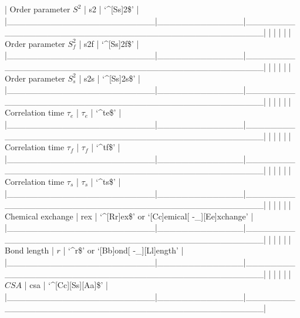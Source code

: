 | Order parameter $S^2$     | s2           | `\^{}[Ss]2\$'                                        |
|\_\_\_\_\_\_\_\_\_\_\_\_\_\_\_\_\_\_\_\_\_\_\_\_|\_\_\_\_\_\_\_\_\_\_\_\_\_\_|\_\_\_\_\_\_\_\_\_\_\_\_\_\_\_\_\_\_\_\_\_\_\_\_\_\_\_\_\_\_\_\_\_\_\_\_\_\_\_\_\_\_\_\_\_\_\_\_\_\_|
|                        |              |                                                  |
| Order parameter $S^2_f$    | s2f          | `\^{}[Ss]2f\$'                                       |
|\_\_\_\_\_\_\_\_\_\_\_\_\_\_\_\_\_\_\_\_\_\_\_\_|\_\_\_\_\_\_\_\_\_\_\_\_\_\_|\_\_\_\_\_\_\_\_\_\_\_\_\_\_\_\_\_\_\_\_\_\_\_\_\_\_\_\_\_\_\_\_\_\_\_\_\_\_\_\_\_\_\_\_\_\_\_\_\_\_|
|                        |              |                                                  |
| Order parameter $S^2_s$    | s2s          | `\^{}[Ss]2s\$'                                       |
|\_\_\_\_\_\_\_\_\_\_\_\_\_\_\_\_\_\_\_\_\_\_\_\_|\_\_\_\_\_\_\_\_\_\_\_\_\_\_|\_\_\_\_\_\_\_\_\_\_\_\_\_\_\_\_\_\_\_\_\_\_\_\_\_\_\_\_\_\_\_\_\_\_\_\_\_\_\_\_\_\_\_\_\_\_\_\_\_\_|
|                        |              |                                                  |
| Correlation time $\tau_e$    | $\tau_e$           | `\^{}te\$'                                           |
|\_\_\_\_\_\_\_\_\_\_\_\_\_\_\_\_\_\_\_\_\_\_\_\_|\_\_\_\_\_\_\_\_\_\_\_\_\_\_|\_\_\_\_\_\_\_\_\_\_\_\_\_\_\_\_\_\_\_\_\_\_\_\_\_\_\_\_\_\_\_\_\_\_\_\_\_\_\_\_\_\_\_\_\_\_\_\_\_\_|
|                        |              |                                                  |
| Correlation time $\tau_f$    | $\tau_f$           | `\^{}tf\$'                                           |
|\_\_\_\_\_\_\_\_\_\_\_\_\_\_\_\_\_\_\_\_\_\_\_\_|\_\_\_\_\_\_\_\_\_\_\_\_\_\_|\_\_\_\_\_\_\_\_\_\_\_\_\_\_\_\_\_\_\_\_\_\_\_\_\_\_\_\_\_\_\_\_\_\_\_\_\_\_\_\_\_\_\_\_\_\_\_\_\_\_|
|                        |              |                                                  |
| Correlation time $\tau_s$    | $\tau_s$           | `\^{}ts\$'                                           |
|\_\_\_\_\_\_\_\_\_\_\_\_\_\_\_\_\_\_\_\_\_\_\_\_|\_\_\_\_\_\_\_\_\_\_\_\_\_\_|\_\_\_\_\_\_\_\_\_\_\_\_\_\_\_\_\_\_\_\_\_\_\_\_\_\_\_\_\_\_\_\_\_\_\_\_\_\_\_\_\_\_\_\_\_\_\_\_\_\_|
|                        |              |                                                  |
| Chemical exchange      | rex          | `\^{}[Rr]ex\$' or `[Cc]emical[ -\_][Ee]xchange'       |
|\_\_\_\_\_\_\_\_\_\_\_\_\_\_\_\_\_\_\_\_\_\_\_\_|\_\_\_\_\_\_\_\_\_\_\_\_\_\_|\_\_\_\_\_\_\_\_\_\_\_\_\_\_\_\_\_\_\_\_\_\_\_\_\_\_\_\_\_\_\_\_\_\_\_\_\_\_\_\_\_\_\_\_\_\_\_\_\_\_|
|                        |              |                                                  |
| Bond length            | $r$            | `\^{}r\$' or `[Bb]ond[ -\_][Ll]ength'                 |
|\_\_\_\_\_\_\_\_\_\_\_\_\_\_\_\_\_\_\_\_\_\_\_\_|\_\_\_\_\_\_\_\_\_\_\_\_\_\_|\_\_\_\_\_\_\_\_\_\_\_\_\_\_\_\_\_\_\_\_\_\_\_\_\_\_\_\_\_\_\_\_\_\_\_\_\_\_\_\_\_\_\_\_\_\_\_\_\_\_|
|                        |              |                                                  |
| $CSA$                    | csa          | `\^{}[Cc][Ss][Aa]\$'                                 |
|\_\_\_\_\_\_\_\_\_\_\_\_\_\_\_\_\_\_\_\_\_\_\_\_|\_\_\_\_\_\_\_\_\_\_\_\_\_\_|\_\_\_\_\_\_\_\_\_\_\_\_\_\_\_\_\_\_\_\_\_\_\_\_\_\_\_\_\_\_\_\_\_\_\_\_\_\_\_\_\_\_\_\_\_\_\_\_\_\_|



